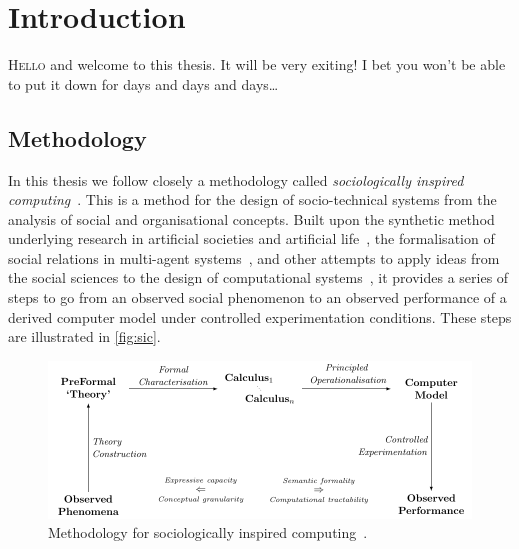 \chapter{Introduction}\label{ch:introduction}

\lettrine[lines=3]{H}{ello} and welcome to this thesis. It will be very exiting! I bet you won't be able to put it down for days and days and days\dots


\section{Methodology}

In this thesis we follow closely a methodology called \emph{sociologically inspired computing}~\citep{Jones2013}. This is a method for the design of socio-technical systems from the analysis of social and organisational concepts. Built upon the synthetic method underlying research in artificial societies and artificial life~\citep{Steels1994}, the formalisation of social relations in multi-agent systems~\citep{Neville2004}, and other attempts to apply ideas from the social sciences to the design of computational systems~\citep{Edmonds2005}, it provides a series of steps to go from an observed social phenomenon to an observed performance of a derived computer model under controlled experimentation conditions. These steps are illustrated in \autoref{fig:sic}.

\begin{figure}
\includegraphics[width=\linewidth]{gfx/sic}
\caption[Methodology for sociologically inspired computing.]{Methodology for sociologically inspired computing~\citep{Jones2013}.}\label{fig:sic}
\end{figure}

